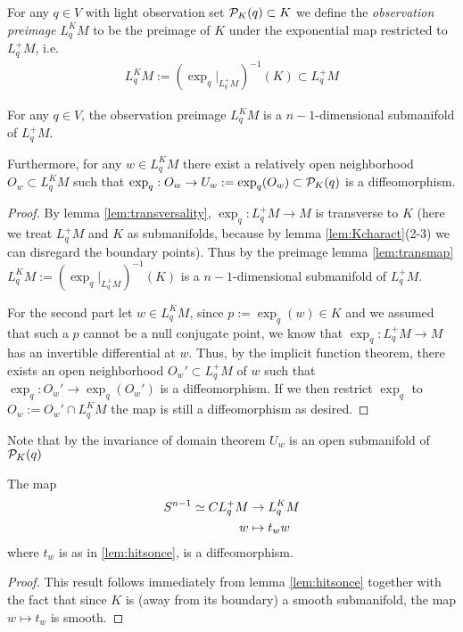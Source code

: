 \begin{definition}
For any $q\in V$ with light observation set ${\mathcal{P}}_K(q)\subset K$ we define the \emph{observation preimage} $L^K_qM$ to be the preimage of $K$ under the exponential map restricted to $L^+_qM$, i.e. 
\begin{align*}
    L^K_qM := (\exp_q\rvert_{L^+_qM})^{-1}(K) \subset L^+_qM
\end{align*}
\end{definition}
\begin{lemma}\label{lem:preimage}
For any $q\in V$, the observation preimage $L^K_qM$ is a $n-1$-dimensional submanifold of $L^+_qM$. 

Furthermore, for any $w\in L^K_qM$ there exist a relatively open neighborhood $O_w\subset L^K_qM$ such that $\exp_q:O_w\to U_w:=\exp_q(O_w)\subset {\mathcal{P}}_K(q)$ is a diffeomorphism.
\end{lemma}
\begin{proof}
    By lemma \ref{lem:transversality}, $\exp_q:L^+_qM\to M$ is transverse to $K$ (here we treat $L^+_qM$ and $K$ as submanifolds, because by lemma \ref{lem:Kcharact}(2-3) we can disregard the boundary points). Thus by the preimage lemma \ref{lem:transmap} $ L^K_qM := (\exp_q\rvert_{L^+_qM})^{-1}(K)$ is a $n-1$-dimensional submanifold of $L^+_qM$.

    For the second part let $w\in L^K_qM$, since $p:=\exp_q(w)\in K$ and we assumed that such a $p$ cannot be a null conjugate point, we know that $\exp_q:L^+_qM\to M$ has an invertible differential at $w$. Thus, by the implicit function theorem, there exists an open neighborhood $O_w'\subset L^+_qM$ of $w$ such that $\exp_q:O_w'\to \exp_q(O_w')$ is a diffeomorphism. If we then restrict $\exp_q$ to $O_w:=O_w' \cap L^K_qM$ the map is still a diffeomorphism as desired.
\end{proof}
Note that by the invariance of domain theorem $U_w$ is an open submanifold of ${\mathcal{P}}_K(q)$

\begin{corollary}\label{cor:lksn}
    The map 
    \begin{align*}
        {S^{n-1}} \simeq CL^+_qM &\to L^K_qM\\
        w &\mapsto t_ww
    \end{align*}
    where $t_w$ is as in \ref{lem:hitsonce}, is a diffeomorphism.
\end{corollary}
\begin{proof}
    This result follows immediately from lemma \ref{lem:hitsonce} together with the fact that since $K$ is (away from its boundary) a smooth submanifold, the map $w\mapsto t_w$ is smooth.
\end{proof}

